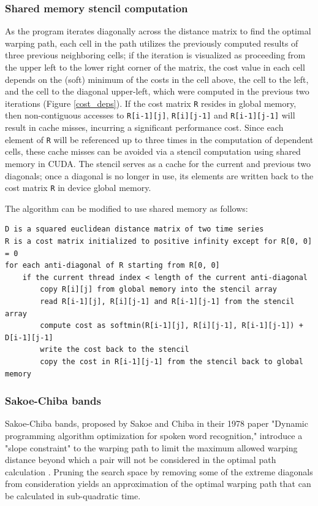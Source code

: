 \documentclass[12pt, letterpaper]{article}
\begin{document}
\subsubsection{Shared memory stencil computation}

As the program iterates diagonally across the distance matrix to find the
optimal warping path, each cell in the path utilizes the previously computed
results of three previous neighboring cells; if the iteration is visualized as
proceeding from the upper left to the lower right corner of the matrix, the cost
value in each cell depends on the (soft) minimum of the costs in the cell
above, the cell to the left, and the cell to the diagonal upper-left, which were
computed in the previous two iterations (Figure \ref{cost_deps}). If the cost
matrix \verb|R| resides in global memory, then non-contiguous accesses to
\verb|R[i-1][j]|, \verb|R[i][j-1]| and \verb|R[i-1][j-1]| will result in cache
misses, incurring a significant performance cost. Since each element of \verb|R|
will be referenced up to three times in the computation of dependent cells,
these cache misses can be avoided via a stencil computation using shared memory
in CUDA. The stencil serves as a cache for the current and previous two
diagonals; once a diagonal is no longer in use, its elements are written back to
the cost matrix \verb|R| in device global memory.

\FloatBarrier
The algorithm can be modified to use shared memory as follows:

\begin{verbatim}
D is a squared euclidean distance matrix of two time series
R is a cost matrix initialized to positive infinity except for R[0, 0] = 0
for each anti-diagonal of R starting from R[0, 0]
    if the current thread index < length of the current anti-diagonal
        copy R[i][j] from global memory into the stencil array
        read R[i-1][j], R[i][j-1] and R[i-1][j-1] from the stencil array
        compute cost as softmin(R[i-1][j], R[i][j-1], R[i-1][j-1]) + D[i-1][j-1]
        write the cost back to the stencil
        copy the cost in R[i-1][j-1] from the stencil back to global memory
\end{verbatim}
\FloatBarrier

\subsubsection{Sakoe-Chiba bands}

Sakoe-Chiba bands, proposed by Sakoe and Chiba in their 1978 paper "Dynamic
programming algorithm optimization for spoken word recognition," introduce a
"slope constraint" to the warping path to limit the maximum allowed warping
distance beyond which a pair will not be considered in the optimal path
calculation \cite{sakoe_dynamic_1978}. Pruning the search space by removing some
of the extreme diagonals from consideration yields an approximation of the
optimal warping path that can be calculated in sub-quadratic time.
\end{document}
